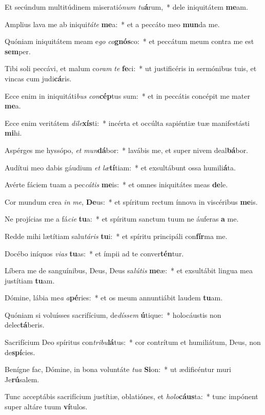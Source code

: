 \item Et secúndum multitúdinem miseratió\textit{num} \textit{tu}\textbf{á}rum,~* dele iniquitátem \textbf{me}am.
\item Amplius lava me ab iniqui\textit{tá}\textit{te} \textbf{me}a:~* et a peccáto meo \textbf{mun}da me.
\item Quóniam iniquitátem meam e\textit{go} \textit{co}\textbf{gnós}co:~* et peccátum meum contra me est \textbf{sem}per.
\item Tibi soli peccávi, et malum co\textit{ram} \textit{te} \textbf{fe}ci:~* ut justificéris in sermónibus tuis, et vincas cum judi\textbf{cá}ris.
\item Ecce enim in iniquitáti\textit{bus} \textit{con}\textbf{cép}tus sum:~* et in peccátis concépit me mater \textbf{me}a.
\item Ecce enim veritátem \textit{di}\textit{le}\textbf{xís}ti:~* incérta et occúlta sapiéntiæ tuæ manifestásti \textbf{mi}hi.
\item Aspérges me hyssópo, \textit{et} \textit{mun}\textbf{dá}bor:~* lavábis me, et super nivem deal\textbf{bá}bor.
\item Audítui meo dabis gáudium \textit{et} \textit{læ}\textbf{tí}tiam:~* et exsultábunt ossa humili\textbf{á}ta.
\item Avérte fáciem tuam a pec\textit{cá}\textit{tis} \textbf{me}is:~* et omnes iniquitátes meas \textbf{de}le.
\item Cor mundum crea \textit{in} \textit{me}, \textbf{De}us:~* et spíritum rectum ínnova in viscéribus \textbf{me}is.
\item Ne projícias me a fá\textit{ci}\textit{e} \textbf{tu}a:~* et spíritum sanctum tuum ne áuferas \textbf{a} me.
\item Redde mihi lætítiam salu\textit{tá}\textit{ris} \textbf{tu}i:~* et spíritu principáli con\textbf{fír}ma me.
\item Docébo iníquos \textit{vi}\textit{as} \textbf{tu}as:~* et ímpii ad te conver\textbf{tén}tur.
\item Líbera me de sanguínibus, Deus, Deus sa\textit{lú}\textit{tis} \textbf{me}æ:~* et exsultábit lingua mea justítiam \textbf{tu}am.
\item Dómine, lábia me\textit{a} \textit{a}\textbf{pé}ries:~* et os meum annuntiábit laudem \textbf{tu}am.
\item Quóniam si voluísses sacrifícium, de\textit{dís}\textit{sem} \textbf{ú}tique:~* holocáustis non delec\textbf{tá}beris.
\item Sacrifícium Deo spíritus con\textit{tri}\textit{bu}\textbf{lá}tus:~* cor contrítum et humiliátum, Deus, non de\textbf{spí}cies.
\item Benígne fac, Dómine, in bona voluntáte \textit{tu}\textit{a} \textbf{Si}on:~* ut ædificéntur muri Je\textbf{rú}salem.
\item Tunc acceptábis sacrifícium justítiæ, oblatiónes, et \textit{ho}\textit{lo}\textbf{cáus}ta:~* tunc impónent super altáre tuum \textbf{ví}tulos.
